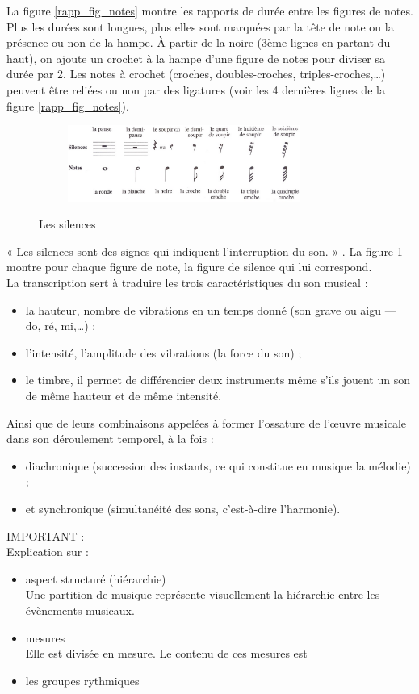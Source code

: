 La figure \ref{rapp_fig_notes} montre les rapports de durée entre les figures
de notes. Plus les durées sont longues, plus elles sont marquées par la tête de
note ou la présence ou non de la hampe. À partir de la noire (3ème lignes en
partant du haut), on ajoute un crochet à la hampe d’une figure de notes pour
diviser sa durée par 2. 
Les notes à crochet (croches, doubles-croches, triples-croches,…) 
peuvent être reliées ou non par des ligatures (voir les 4 dernières lignes de
la figure \ref{rapp_fig_notes}).\newpage
\begin{figure}[h]
	\centering
	\includegraphics[height=25mm, width=95mm]{
    z_images/3_methodes/0_notation_de_la_batterie/4_silences.png}
	\caption{Les silences}\cite{danhauser}
	\label{silences}
\end{figure}
« Les silences sont des signes qui indiquent l’interruption du son. »
\cite{danhauser}. La figure \ref{silences} montre pour chaque figure de note,
la figure de silence qui lui correspond.\\

La transcription sert à traduire les trois caractéristiques du son musical :
\begin{itemize}
	\item la hauteur, nombre de vibrations en un temps donné (son grave ou
        aigu — do, ré, mi,…) ;
	\item l’intensité, l’amplitude des vibrations (la force du son) ;
	\item le timbre, il permet de différencier deux instruments même s’ils
        jouent un son de même hauteur et de même intensité.
\end{itemize}

Ainsi que de leurs combinaisons appelées à former l’ossature de l’œuvre
musicale dans son déroulement temporel, à la fois :
\begin{itemize}
	\item diachronique (succession des instants, ce qui constitue en musique la
        mélodie) ;
	\item et synchronique (simultanéité des sons, c’est-à-dire l’harmonie).
\end{itemize}

IMPORTANT :\\
Explication sur :
\begin{itemize}
    \item aspect structuré (hiérarchie)\\
        Une partition de musique représente visuellement la hiérarchie entre
        les évènements musicaux.
    \item mesures\\
            Elle est divisée en mesure. Le contenu de ces mesures est 
    \item les groupes rythmiques
\end{itemize}
